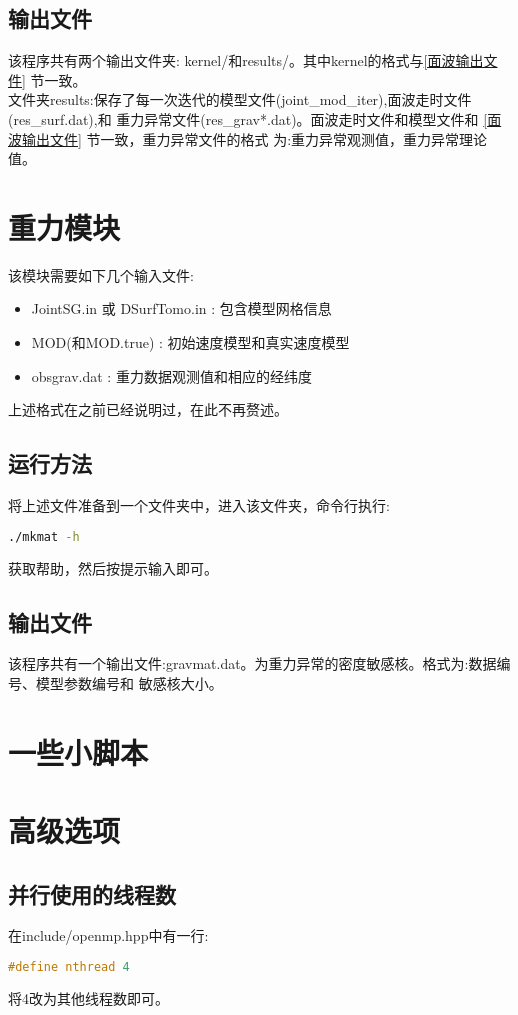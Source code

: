 \documentclass[10p,UTF8]{ctexart}
\begin{document}
    \subsection{输出文件}
    该程序共有两个输出文件夹: kernel/和results/。其中kernel的格式与\ref{面波输出文件} 节一致。\\
    文件夹results:保存了每一次迭代的模型文件(joint\_mod\_iter\*),面波走时文件(res\_surf\*.dat),和
    重力异常文件(res\_grav*.dat)。面波走时文件和模型文件和 \ref{面波输出文件} 节一致，重力异常文件的格式
    为:重力异常观测值，重力异常理论值。
 

    \section{重力模块}
    该模块需要如下几个输入文件:
    \begin{itemize}
        \item JointSG.in 或 DSurfTomo.in : 包含模型网格信息
        \item MOD(和MOD.true) : 初始速度模型和真实速度模型
        \item obsgrav.dat : 重力数据观测值和相应的经纬度
    \end{itemize}
    上述格式在之前已经说明过，在此不再赘述。

    \subsection{运行方法}
    将上述文件准备到一个文件夹中，进入该文件夹，命令行执行:
    \begin{lstlisting}[language=bash]
     ./mkmat -h
    \end{lstlisting}
    获取帮助，然后按提示输入即可。
    \subsection{输出文件}
    该程序共有一个输出文件:gravmat.dat。为重力异常的密度敏感核。格式为:数据编号、模型参数编号和
    敏感核大小。


    \section{一些小脚本}

   \section{高级选项}
    \subsection{并行使用的线程数}\label{线程数}
    在include/openmp.hpp中有一行:
    \begin{lstlisting}[language=c++]
    #define nthread 4
    \end{lstlisting}
    将4改为其他线程数即可。
\end{document}
